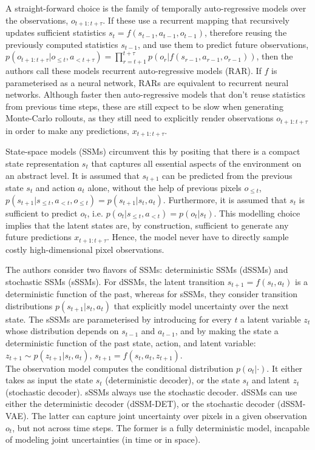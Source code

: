 A straight-forward choice is the family of temporally auto-regressive models over the observations, $o_{t+1:t+\tau}$. If these use a recurrent mapping that recursively updates sufficient statistics $s_t = f(s_{t−1}, a_{t−1}, o_{t−1})$, therefore reusing the previously computed statistics $s_{t-1}$, and use them to predict future observations, $p(o_{t+1:t+\tau} | o_{\leqslant t}, a_{<t+\tau}) = \prod^{t+\tau}_{r=t+1} p(o_r | f(s_{r−1}, a_{r−1}, o_{r−1}))$, then the authors call these models recurrent auto-regressive models (RAR). If $f$ is parameterised as a neural network, RARs are equivalent to recurrent neural networks. Although faster then auto-regressive models that don't reuse statistics from previous time steps, these are still expect to be slow when generating Monte-Carlo rollouts, as they still need to explicitly render observations $o_{t+1:t+\tau}$ in order to make any predictions, $x_{t+1:t+\tau}$.

State-space models (SSMs) circumvent this by positing that there is a compact state representation $s_t$ that captures all essential aspects of the environment on an abstract level. It is assumed that $s_{t+1}$ can be predicted from the previous state $s_t$ and action $a_t$ alone, without the help of previous pixels $o_{\leqslant t}$, $p(s_{t+1}|s_{\leqslant t}, a_{<t}, o_{\leqslant t}) = p(s_{t+1}| s_t, a_t)$. Furthermore, it is assumed that $s_t$ is sufficient to predict $o_t$, i.e. $p(o_t|s_{\leqslant t}, a_{<t}) = p(o_t|s_t)$. This modelling choice implies that the latent states are, by construction, sufficient to generate any future predictions $x_{t+1:t+\tau}$. Hence, the model never have to directly sample costly high-dimensional pixel observations.

The authors consider two flavors of SSMs: deterministic SSMs (dSSMs) and stochastic SSMs (sSSMs). For dSSMs, the latent transition $s_{t+1} = f(s_t, a_t)$ is a deterministic function of the past, whereas for sSSMs, they consider transition distributions $p(s_{t+1}|s_t, a_t)$ that explicitly model uncertainty over the next state. The sSSMs are parameterised by introducing for every $t$ a latent variable $z_t$ whose distribution depends on $s_{t−1}$ and $a_{t−1}$, and by making the state a deterministic function of the past state, action, and latent variable: $z_{t+1} \sim p(z_{t+1}|s_t, a_t)$, $s_{t+1} = f(s_t, a_t, z_{t+1})$. \\
The observation model computes the conditional distribution $p(o_t|\cdot)$. It either takes as input the state $s_t$ (deterministic decoder), or the state $s_t$ and latent $z_t$ (stochastic decoder). sSSMs always use the stochastic decoder. dSSMs can use either the deterministic decoder (dSSM-DET), or the stochastic decoder (dSSM-VAE). The latter can capture joint uncertainty over pixels in a given observation $o_t$, but not across time steps. The former is a fully deterministic model, incapable of modeling joint uncertainties (in time or in space).

